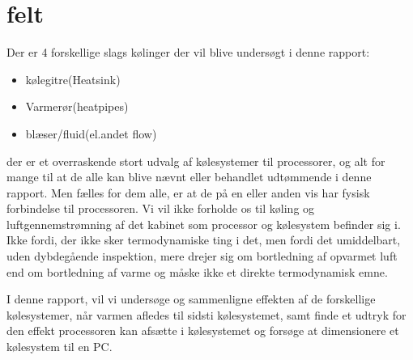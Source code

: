 \section{felt}

Der er 4 forskellige slags kølinger der vil blive undersøgt i denne rapport: 

\begin{itemize}
	\item kølegitre(Heatsink)
	\item Varmerør(heatpipes)
	\item blæser/fluid(el.andet flow)
\end{itemize}


der er et overraskende stort udvalg af kølesystemer til processorer, og alt for mange til at de alle kan blive nævnt eller behandlet udtømmende i denne rapport. Men fælles for dem alle, er at de på en eller anden vis har fysisk forbindelse til processoren.
Vi vil ikke forholde os til køling og luftgennemstrømning af det kabinet som processor og kølesystem befinder sig i. Ikke fordi, der ikke sker termodynamiske ting i det, men fordi det umiddelbart, uden dybdegående inspektion, mere drejer sig om bortledning af opvarmet luft end om bortledning af varme og måske ikke et direkte termodynamisk emne.

I denne rapport, vil vi undersøge og sammenligne effekten af de forskellige kølesystemer, når varmen afledes til sidsti kølesystemet, samt finde et udtryk for den effekt processoren kan afsætte i kølesystemet og forsøge at dimensionere et kølesystem til en PC.

